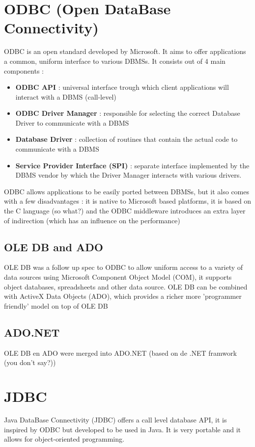 \documentclass{report}
\begin{document}
		\section{ODBC (Open DataBase Connectivity)}
			ODBC is an open standard developed by Microsoft. It aims to offer applications a common, uniform interface to various DBMSs. It consists out of 4 main components : 
			\begin{itemize}
				\item \textbf{ODBC API} : universal interface trough which client applications will interact with a DBMS (call-level)
				\item \textbf{ODBC Driver Manager} : responsible for selecting the correct Database Driver to communicate with a DBMS
				\item \textbf{Database Driver} : collection of routines that contain the actual code to communicate with a DBMS
				\item \textbf{Service Provider Interface (SPI)} : separate interface implemented by the DBMS vendor by which the Driver Manager interacts with various drivers.
			\end{itemize}
			ODBC allows applications to be easily ported between DBMSs, but it also comes with a few disadvantages : it is native to Microsoft based platforms, it is based on the C language (so what?) and the ODBC middleware introduces an extra layer of indirection (which has an influence on the performance)
			\subsection{OLE DB and ADO}
				OLE DB was a follow up spec to ODBC to allow uniform access to a variety of data sources using Microsoft Component Object Model (COM), it supports object databases, spreadsheets and other data source. OLE DB can be combined with ActiveX Data Objects (ADO), which provides a richer more 'programmer friendly' model on top of OLE DB
			\subsection{ADO.NET}
				OLE DB en ADO were merged into ADO.NET (based on de .NET framwork (you don't say?))
		\section{JDBC}
			Java DataBase Connectivity (JDBC) offers a call level database API, it is inspired by ODBC but developed to be used in Java. It is very portable and it allows for object-oriented programming.
				
				
\end{document}
